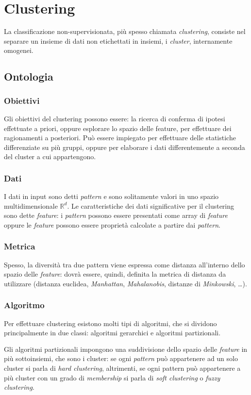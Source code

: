 \documentclass[\main/main.tex]{subfiles}
\begin{document}
\section{Clustering}
La classificazione non-supervisionata, più spesso chiamata \textit{clustering}, consiste nel separare un insieme di dati non etichettati in insiemi, i \textit{cluster}, internamente omogenei.
\subsection{Ontologia}
\subsubsection{Obiettivi}
Gli obiettivi del clustering possono essere: la ricerca di conferma di ipotesi effettuate a priori, oppure esplorare lo spazio delle feature, per effettuare dei ragionamenti a posteriori. Può essere impiegato per effettuare delle statistiche differenziate su più gruppi, oppure per elaborare i dati differentemente a seconda del cluster a cui appartengono.
\subsubsection{Dati}
I dati in input sono detti \textit{pattern} e sono solitamente valori in uno spazio multidimensionale $\mathbb{R}^d$. Le caratteristiche dei dati significative per il clustering sono dette \textit{feature}: i \textit{pattern} possono essere presentati come array di \textit{feature} oppure le \textit{feature} possono essere proprietà calcolate a partire dai \textit{pattern}.
\subsubsection{Metrica}
Spesso, la diversità tra due pattern viene espressa come distanza all'interno dello spazio delle \textit{feature}: dovrà essere, quindi, definita la metrica di distanza da utilizzare (distanza euclidea, \textit{Manhattan}, \textit{Mahalanobis}, distanze di \textit{Minkowski}, \dots ).

\subsubsection{Algoritmo}
Per effettuare clustering esistono molti tipi di algoritmi, che si dividono principalmente in due classi: algoritmi gerarchici e algoritmi partizionali.

Gli algoritmi partizionali impongono una suddivisione dello spazio delle \textit{feature} in più sottoinsiemi, che sono i cluster: se ogni \textit{pattern} può appartenere ad un solo cluster si parla di \textit{hard clustering}, altrimenti, se ogni pattern può appartenere a più cluster con un grado di \textit{membership} si parla di \textit{soft clustering} o \textit{fuzzy clustering}.
\end{document}
